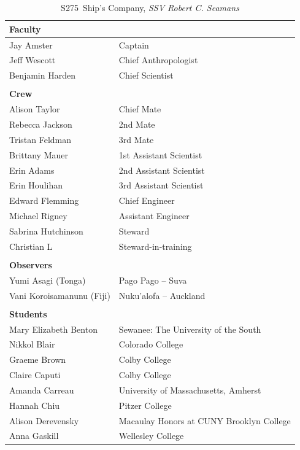 \documentclass[letterpaper,11pt]{article}
\newcommand{\cruiseID}{S275}
\begin{document}
\begin{table}[ht]
 \caption{\label{shipCompany} \cruiseID\ Ship's Company, \textit{SSV Robert C. Seamans}}\\
\\
\begin{tabular}{p{8cm} l}
 
  \vspace*{0.2cm}
  \textbf{Faculty} \\
  \hline
  Jay Amster & Captain\\
  Jeff Wescott & Chief Anthropologist\\
  Benjamin Harden & Chief Scientist\\
\\
  \textbf{Crew}\\
  \hline
  Alison Taylor  & Chief Mate\\
  Rebecca Jackson & 2nd Mate\\
  Tristan Feldman & 3rd Mate\\
  Brittany Mauer & 1st Assistant Scientist\\
  Erin Adams & 2nd Assistant Scientist\\
  Erin Houlihan & 3rd Assistant Scientist\\
  Edward Flemming & Chief Engineer\\
  Michael Rigney & Assistant Engineer\\
  Sabrina Hutchinson & Steward\\
  Christian L & Steward-in-training\\
\\
  \textbf{Observers}\\
  \hline
  Yumi Asagi (Tonga) & Pago Pago -- Suva\\
  Vani Koroisamanunu (Fiji) & Nuku'alofa -- Auckland\\
\\
  \textbf{Students}\\
  \hline
  Mary Elizabeth Benton &	Sewanee: The University of the South \\
  Nikkol Blair	& Colorado College \\
  Graeme Brown&	Colby College \\
  Claire Caputi &	Colby College\\
  Amanda Carreau&	University of Massachusetts, Amherst\\
  Hannah Chiu &	Pitzer College\\
  Alison Derevensky&	Macaulay Honors at CUNY Brooklyn College\\
  Anna Gaskill	&Wellesley College\\

\end{tabular}
\end{table}
\end{document}

